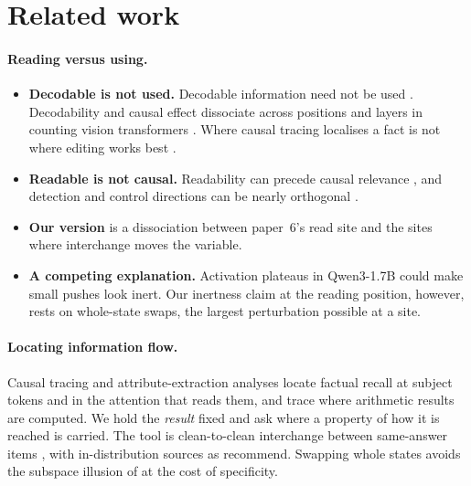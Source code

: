 \documentclass[11pt]{article}
\begin{document}
\section{Related work}
\label{sec:related}

\paragraph{Reading versus using.}
\begin{itemize}
\item \textbf{Decodable is not used.} Decodable information need not be used \citep{elazar2020amnesic}. Decodability and causal effect dissociate across positions and layers in counting vision transformers \citep{huang2025causality}. Where causal tracing localises a fact is not where editing works best \citep{hase2023localization}.
\item \textbf{Readable is not causal.} Readability can precede causal relevance \citep{xun2026lagged}, and detection and control directions can be nearly orthogonal \citep{galeone2026perfect}.
\item \textbf{Our version} is a dissociation between paper~6's read site and the sites where interchange moves the variable.
\item \textbf{A competing explanation.} Activation plateaus in Qwen3-1.7B \citep{ferreiradasilva2026error} could make small pushes look inert. Our inertness claim at the reading position, however, rests on whole-state swaps, the largest perturbation possible at a site.
\end{itemize}

\paragraph{Locating information flow.} Causal tracing \citep{meng2022locating} and attribute-extraction analyses \citep{geva2023dissecting} locate factual recall at subject tokens and in the attention that reads them, and \citet{stolfo2023mechanistic} trace where arithmetic results are computed. We hold the \emph{result} fixed and ask where a property of how it is reached is carried. The tool is clean-to-clean interchange between same-answer items \citep{geiger2021inducing}, with in-distribution sources as \citet{zhang2023best} recommend. Swapping whole states avoids the subspace illusion of \citet{makelov2023subspace} at the cost of specificity.
\end{document}

